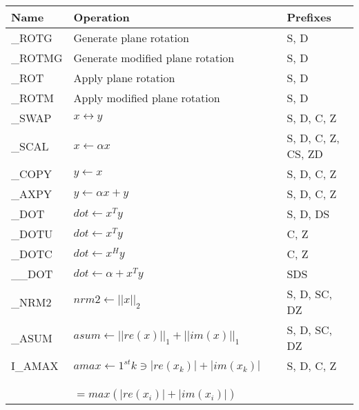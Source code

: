 \begin{tabular}{l l|l}
Name   &Operation                     & Prefixes \\
\hline
\_ROTG & Generate plane rotation 
   & S, D \\
\_ROTMG & Generate modified plane rotation
   & S, D \\
\_ROT & Apply plane rotation
   & S, D \\
\_ROTM & Apply modified plane rotation
   & S, D \\
\_SWAP & $ x \leftrightarrow y $
   & S, D, C, Z \\
\_SCAL & $ x \leftarrow \alpha x $
   & S, D, C, Z, CS, ZD \\
\_COPY & $ y \leftarrow x $
   & S, D, C, Z \\
\_AXPY & $ y \leftarrow \alpha x + y $
   & S, D, C, Z \\
\_DOT & $ dot \leftarrow x ^ {T} y $
   & S, D, DS \\
\_DOTU & $ dot \leftarrow x ^ {T} y $
   & C, Z \\
\_DOTC & $ dot \leftarrow x ^ {H} y $
   & C, Z \\
\_\_DOT & $ dot \leftarrow \alpha + x ^ {T} y $
   & SDS \\
\_NRM2 & $ nrm2 \leftarrow || x || _ {2} $
   & S, D, SC, DZ \\
\_ASUM & $ asum \leftarrow || re( x ) || _ {1}  + || im( x ) || _ {1} $
   & S, D, SC, DZ \\
I\_AMAX & $ amax \leftarrow 1^{st} k \ni | re( x _ {k} ) |  + | im( x _ {k} ) | $
   & S, D, C, Z \\
\vspace{.33in}
& \verb+            + $ = max( | re( x _ {i} ) |  + | im( x _ {i} ) | ) $ \\
\end{tabular}

\vspace*{\fill}
\pagebreak 

